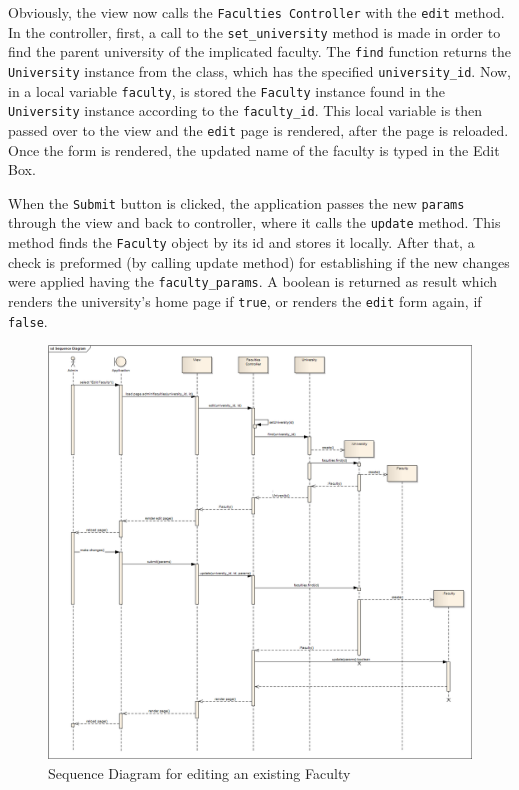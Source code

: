 Obviously, the view now calls the \texttt{Faculties Controller} with the \texttt{edit} method. In the controller, first, a call to the \texttt{set\_university} method is made in order to find the parent university of the implicated faculty. The \texttt{find} function returns the \texttt{University} instance from the class, which has the specified \texttt{university\_id}. Now, in a local variable \texttt{faculty}, is stored the \texttt{Faculty} instance found in the \texttt{University} instance according to the \texttt{faculty\_id}. This local variable is then passed over to the view and the \texttt{edit} page is rendered, after the page is reloaded. Once the form is rendered, the updated name of the faculty is typed in the Edit Box. 

When the \texttt{Submit} button is clicked, the application passes the new \texttt{params} through the view and back to controller, where it calls the \texttt{update} method. This method finds the \texttt{Faculty} object by its id and stores it locally. After that, a check is preformed (by calling update method) for establishing if the new changes were applied having the \texttt{faculty\_params}. A boolean is returned as result which renders the university's home page if \texttt{true}, or renders the \texttt{edit} form again, if \texttt{false}.

\begin{figure}[H]
\centering
\includegraphics[width=18cm]{Chapter2/Sequence_Diagram.png}
\caption{Sequence Diagram for editing an existing Faculty}
\label{fig:Sequence_Diagram}
\end{figure}

